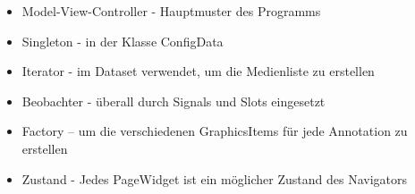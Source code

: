 \begin{itemize}
\item Model-View-Controller - Hauptmuster des Programms
\item Singleton - in der Klasse ConfigData  
\item Iterator - im Dataset verwendet, um die Medienliste zu erstellen 
\item Beobachter - überall durch Signals und Slots eingesetzt
\item Factory – um die verschiedenen GraphicsItems für jede Annotation zu erstellen
\item Zustand - Jedes PageWidget ist ein möglicher Zustand des Navigators
\end{itemize}
